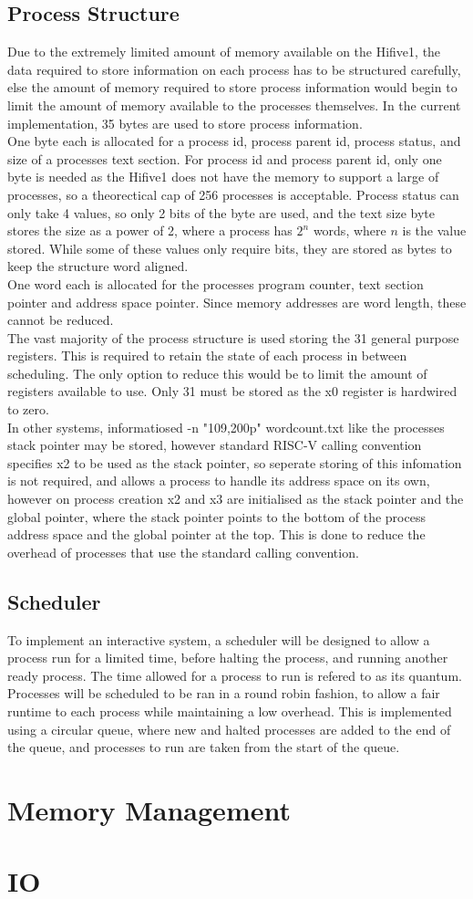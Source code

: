 \subsection{Process Structure}
Due to the extremely limited amount of memory available on the Hifive1, the data required to store information on each process has to be structured carefully, else the amount of memory required to store process information would begin to limit the amount of memory available to the processes themselves. In the current implementation, 35 bytes are used to store process information.
\\
One byte each is allocated for a process id, process parent id, process status, and size of a processes text section. For process id and process parent id, only one byte is needed as the Hifive1 does not have the memory to support a large of processes, so a theorectical cap of 256 processes is acceptable. Process status can only take 4 values, so only 2 bits of the byte are used, and the text size byte stores the size as a power of 2, where a process has \(2^n\) words, where \(n\) is the value stored. While some of these values only require bits, they are stored as bytes to keep the structure word aligned. 
\\
One word each is allocated for the processes program counter, text section pointer and address space pointer. Since memory addresses are word length, these cannot be reduced.
\\
The vast majority of the process structure is used storing the 31 general purpose registers. This is required to retain the state of each process in between scheduling. The only option to reduce this would be to limit the amount of registers available to use. Only 31 must be stored as the x0 register is hardwired to zero.
\\
In other systems, informatiosed -n "109,200p" wordcount.txt like the processes stack pointer may be stored, however standard RISC-V calling convention specifies x2 to be used as the stack pointer, so seperate storing of this infomation is not required, and allows a process to handle its address space on its own, however on process creation x2 and x3 are initialised as the stack pointer and the global pointer, where the stack pointer points to the bottom of the process address space and the global pointer at the top. This is done to reduce the overhead of processes that use the standard calling convention.
\subsection{Scheduler}
To implement an interactive system, a scheduler will be designed to allow a process run for a limited time, before halting the process, and running another ready process. The time allowed for a process to run is refered to as its quantum. Processes will be scheduled to be ran in a round robin fashion, to allow a fair runtime to each process while maintaining a low overhead. This is implemented using a circular queue, where new and halted processes are added to the end of the queue, and processes to run are taken from the start of the queue.
\section{Memory Management}
\section{IO}